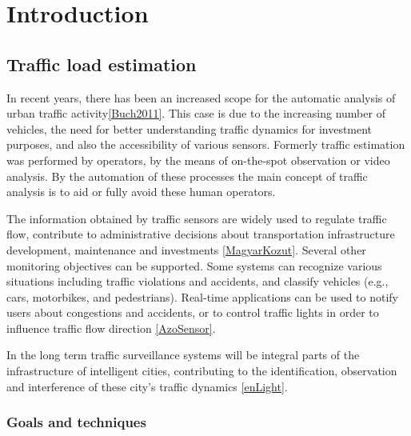 \chapter*{Introduction}
\section{Traffic load estimation}
In recent years, there has been an increased scope for
the automatic analysis of urban traffic activity\ref{Buch2011}.
This case is due to the increasing number of vehicles, the need for better understanding traffic dynamics for investment purposes, and also the
accessibility of various sensors.
Formerly traffic estimation was performed by operators, by the means of on-the-spot observation or video analysis.
By the automation of these processes the main concept of traffic analysis is to aid or fully avoid these human operators.

The information obtained by traffic sensors are widely used to regulate traffic flow, contribute to administrative decisions about transportation infrastructure development, maintenance and investments \ref{MagyarKozut}.
Several other monitoring objectives can be supported. 
Some systems can recognize various situations including traffic
violations and accidents, and classify vehicles (e.g., cars, motorbikes, and
pedestrians).
Real-time applications can be used to notify users about congestions and accidents, or to control traffic lights in order to influence traffic flow direction \ref{AzoSensor}.

In the long term traffic surveillance systems will be integral parts of the infrastructure of intelligent cities, contributing to the identification, observation and interference of these city's traffic dynamics \ref{enLight}.




\subsection{Goals and techniques}

